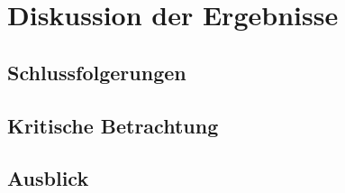 
\chapter{Diskussion der Ergebnisse}\label{chapter: Diskussion der Ergebnisse}

	\section{Schlussfolgerungen}\label{section: Schlussfolgerungen}
	
	\section{Kritische Betrachtung}
	
	\section{Ausblick}
